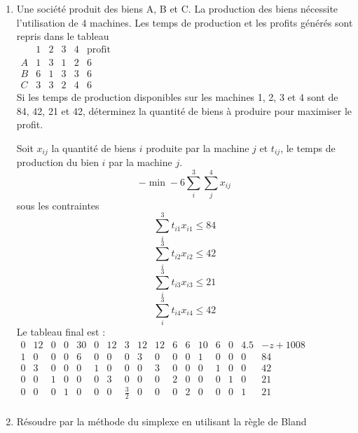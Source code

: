 \begin{enumerate}
  \item Une société produit des biens A, B et C. La production des biens nécessite l'utilisation de 4 machines. Les temps de
    production et les profits générés sont repris dans le tableau\\

    $
    \begin{array}{l|llll|l}
      & 1 & 2 & 3 & 4 & \mbox{profit}\\
      \hline
      A & 1 & 3 & 1 & 2 & 6\\
      B & 6 & 1 & 3 & 3 & 6\\
      C & 3 & 3 & 2 & 4 & 6
    \end{array}
    $
    \\

    Si les temps de production disponibles sur les machines 1, 2, 3 et 4  sont de 84, 42, 21 et 42,
    déterminez la quantité de biens à produire pour maximiser le profit.






    \begin{solution}
      Soit $x_{ij}$ la quantité de biens $i$ produite par la machine $j$ et $t_{ij}$, le temps de production du bien $i$ par la machine $j$.
      \newline
      $$ -\min -6\sum_{i}^{3} \sum_{j}^{4}x_{ij}$$
      sous les contraintes \\
      $$ \sum_{i}^{3} t_{i1}x_{i1} \le 84$$
      $$ \sum_{i}^{3} t_{i2}x_{i2} \le 42$$
      $$ \sum_{i}^{3} t_{i3}x_{i3} \le 21$$
      $$ \sum_{i}^{3} t_{i4}x_{i4} \le 42$$
      Le tableau final est :\\
      \newline
      $\begin{array}
      {cccccccccccccccc|l}
      0&12&0&0&30&0&12&3&12&12&6&6&10&6&0&4.5&-z+1008 \\ \hline
      1&0&0&0&6&0&0&0&3&0&0&0&1&0&0&0&84\\
      0&3&0&0&0&1&0&0&0&3&0&0&0&1&0&0&42\\
      0&0&1&0&0&0&3&0&0&0&2&0&0&0&1&0&21\\
      0&0&0&1&0&0&0&\frac{3}{2}&0&0&0&2&0&0&0&1&21
      \\\end{array}$\\
    \end{solution}

  \item Résoudre par la méthode du simplexe en utilisant la règle de Bland




\end{enumerate}
